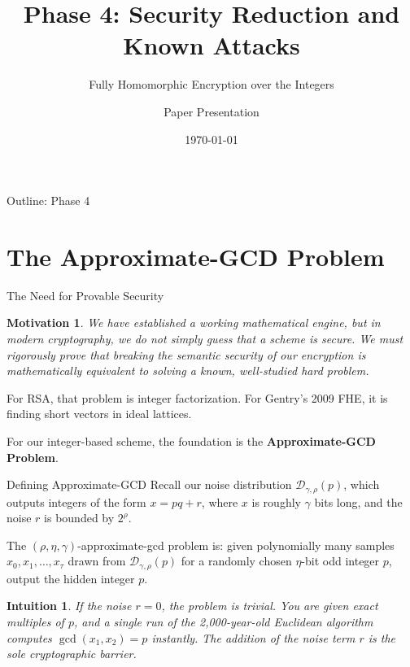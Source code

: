 \documentclass[10pt, aspectratio=169]{beamer}
\title[Phase 4: Security \& Attacks]{Phase 4: Security Reduction and Known Attacks}
\subtitle{Fully Homomorphic Encryption over the Integers}
\author{Paper Presentation}
\date{\today}
\newtheorem{intuition}{Intuition}
\newtheorem{motivation}{Motivation}
\begin{document}
\frame{\titlepage}

\begin{frame}{Outline: Phase 4}
    \tableofcontents
\end{frame}

\section{The Approximate-GCD Problem}

\begin{frame}{The Need for Provable Security}
    \begin{motivation}
    We have established a working mathematical engine, but in modern cryptography, we do not simply \textit{guess} that a scheme is secure. We must rigorously prove that breaking the semantic security of our encryption is mathematically equivalent to solving a known, well-studied hard problem.
    \end{motivation}
    \pause
    
    \vspace{0.3cm}
    For RSA, that problem is integer factorization. For Gentry's 2009 FHE, it is finding short vectors in ideal lattices.
    \pause
    
    \vspace{0.3cm}
    For our integer-based scheme, the foundation is the \textbf{Approximate-GCD Problem}.
\end{frame}

\begin{frame}{Defining Approximate-GCD}
    Recall our noise distribution $\mathcal{D}_{\gamma,\rho}(p)$, which outputs integers of the form $x = pq + r$, where $x$ is roughly $\gamma$ bits long, and the noise $r$ is bounded by $2^\rho$.
    \pause

    \vspace{0.3cm}
    \begin{definition}
    The $(\rho, \eta, \gamma)$-approximate-gcd problem is: given polynomially many samples $x_0, x_1, \dots, x_\tau$ drawn from $\mathcal{D}_{\gamma,\rho}(p)$ for a randomly chosen $\eta$-bit odd integer $p$, output the hidden integer $p$.
    \end{definition}
    \pause
    
    \vspace{0.3cm}
    \begin{intuition}
    If the noise $r=0$, the problem is trivial. You are given exact multiples of $p$, and a single run of the 2,000-year-old Euclidean algorithm computes $\gcd(x_1, x_2) = p$ instantly. The addition of the noise term $r$ is the sole cryptographic barrier.
    \end{intuition}
\end{frame}
\end{document}
